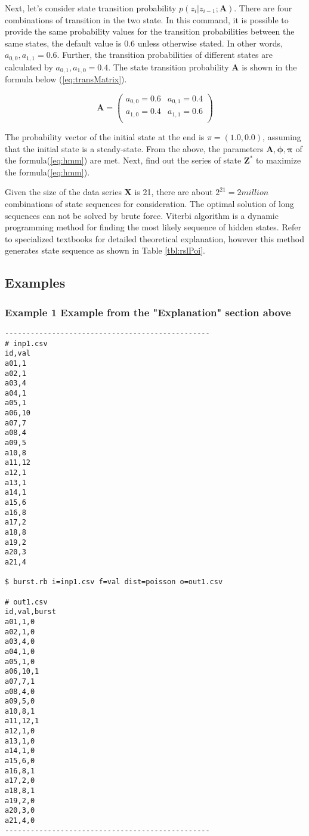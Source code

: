 Next, let's consider state transition probability $p(z_i|z_{i-1};\mathbf{A})$. There are four combinations of transition in the two state. In this command, it is possible to provide the same probability values for the transition probabilities between the same states, the default value is 0.6 unless otherwise stated.
In other words, $a_{0,0},a_{1,1}=0.6$. Further, the transition probabilities of different states are calculated by $a_{0,1},a_{1,0}=0.4$. The state transition probability $\mathbf{A}$ is shown in the formula below (\ref{eq:transMatrix}).

\begin{equation}
\mathbf{A}=\left(
\begin{array}{cc}
a_{0,0}=0.6 &a_{0,1}=0.4 \\
a_{1,0}=0.4 &a_{1,1}=0.6 \\
\end{array}
\right)
\label{eq:transMatrix}
\end{equation}

The probability vector of the initial state at the end is $\pi=(1.0,0.0)$, assuming that the initial state is a steady-state.
From the above, the parameters $\mathbf{A},\boldsymbol{\phi},\boldsymbol{\pi}$ of the formula(\ref{eq:hmm}) are met. Next, find out the series of state $\mathbf{Z}^*$ to maximize the formula(\ref{eq:hmm}).

Given the size of the data series $\mathbf{X}$ is 21, there are about $2^{21}=2 million$  combinations of state sequences for consideration. The optimal solution of long sequences can not be solved by brute force.
Viterbi algorithm is a dynamic programming method for finding the most likely sequence of hidden states. Refer to specialized textbooks for detailed theoretical explanation, however this method generates state sequence as shown in Table \ref{tbl:rslPoi}.

\subsection*{Examples}
\subsubsection*{Example 1 Example from the "Explanation" section above}

\begin{verbatim}
------------------------------------------------
# inp1.csv
id,val
a01,1
a02,1
a03,4
a04,1
a05,1
a06,10
a07,7
a08,4
a09,5
a10,8
a11,12
a12,1
a13,1
a14,1
a15,6
a16,8
a17,2
a18,8
a19,2
a20,3
a21,4

$ burst.rb i=inp1.csv f=val dist=poisson o=out1.csv

# out1.csv
id,val,burst
a01,1,0
a02,1,0
a03,4,0
a04,1,0
a05,1,0
a06,10,1
a07,7,1
a08,4,0
a09,5,0
a10,8,1
a11,12,1
a12,1,0
a13,1,0
a14,1,0
a15,6,0
a16,8,1
a17,2,0
a18,8,1
a19,2,0
a20,3,0
a21,4,0
------------------------------------------------
\end{verbatim}

